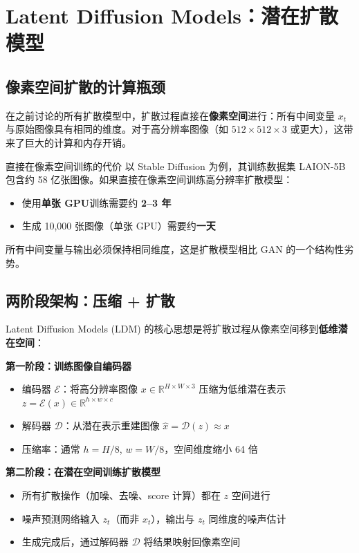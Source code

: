 \section{Latent Diffusion Models：潜在扩散模型}

\subsection{像素空间扩散的计算瓶颈}

在之前讨论的所有扩散模型中，扩散过程直接在\textbf{像素空间}进行：所有中间变量 $x_t$ 与原始图像具有相同的维度。对于高分辨率图像（如 $512\times512\times3$ 或更大），这带来了巨大的计算和内存开销。

\begin{warningbox}{直接在像素空间训练的代价}
以 Stable Diffusion 为例，其训练数据集 LAION-5B 包含约 58 亿张图像。如果直接在像素空间训练高分辨率扩散模型：
\begin{itemize}
    \item 使用\textbf{单张 GPU}训练需要约 \textbf{2--3 年}
    \item 生成 10,000 张图像（单张 GPU）需要约\textbf{一天}
\end{itemize}
所有中间变量与输出必须保持相同维度，这是扩散模型相比 GAN 的一个结构性劣势。
\end{warningbox}

\subsection{两阶段架构：压缩 + 扩散}

Latent Diffusion Models (LDM) 的核心思想是将扩散过程从像素空间移到\textbf{低维潜在空间}：

\textbf{第一阶段：训练图像自编码器}
\begin{itemize}
    \item 编码器 $\mathcal{E}$：将高分辨率图像 $x \in \mathbb{R}^{H\times W\times 3}$ 压缩为低维潜在表示 $z = \mathcal{E}(x) \in \mathbb{R}^{h\times w\times c}$
    \item 解码器 $\mathcal{D}$：从潜在表示重建图像 $\hat{x} = \mathcal{D}(z) \approx x$
    \item 压缩率：通常 $h = H/8$, $w = W/8$，空间维度缩小 64 倍
\end{itemize}

\textbf{第二阶段：在潜在空间训练扩散模型}
\begin{itemize}
    \item 所有扩散操作（加噪、去噪、score 计算）都在 $z$ 空间进行
    \item 噪声预测网络输入 $z_t$（而非 $x_t$），输出与 $z_t$ 同维度的噪声估计
    \item 生成完成后，通过解码器 $\mathcal{D}$ 将结果映射回像素空间
\end{itemize}

